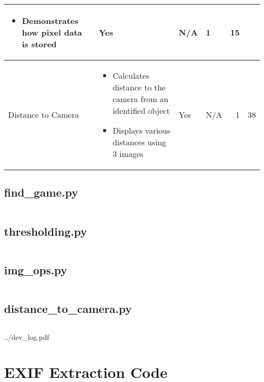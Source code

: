 \begin{landscape}
\begin{table}[h!]
\begin{tabular}{|l|p{}|l|p{}|r|r|}
\begin{itemize}[noitemsep,topsep=0pt,parsep=0pt]
						\item{Demonstrates how pixel data is stored}
					\end{itemize}&
					Yes&
					N/A&
					1&
					15\\
					\hline
					Distance to Camera&
					\begin{itemize}[noitemsep,topsep=0pt,parsep=0pt]
						\item{Calculates distance to the camera from an identified object}
						\item{Displays various distances using 3 images}
					\end{itemize}&
					Yes&
					N/A&
					1&
					38\\
					\hline
				\end{tabular}
			\end{table}
		\end{landscape}
		\restoregeometry
		\subsection{find\_game.py}
		\inputminted[breaklines,
						linenos,
						frame=lines,
						fontsize=\footnotesize]{python}{../code/python/find_game.py}
		\subsection{thresholding.py}
		\inputminted[breaklines,
						linenos,
						frame=lines,
						fontsize=\footnotesize]{python}{../code/python/thresholding.py}
		\subsection{img\_ops.py}
		\inputminted[breaklines,
						linenos,
						frame=lines,
						fontsize=\footnotesize]{python}{../code/python/img_ops.py}
		\subsection{distance\_to\_camera.py}
		\inputminted[breaklines,
						linenos,
						frame=lines,
						fontsize=\footnotesize]{python}{../code/python/distance_to_camera.py}
\clearpage

			{../dev_log.pdf}

\clearpage
\section{EXIF Extraction Code}\label{app:exif_code}
	\inputminted[breaklines,
				linenos,
				frame=lines,
				fontsize=\footnotesize,
				firstline=36,
				lastline=63]{python}{../code/program/v2.py}
\clearpage
